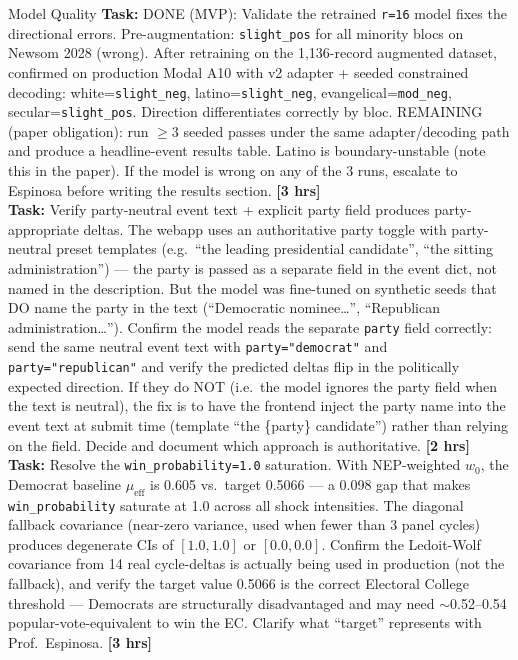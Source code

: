 \documentclass[11pt]{article}
\newcommand{\hrs}[1]{\textbf{[#1 hrs]}}
\newcommand{\task}[2]{%
  \noindent\textbf{Task:} #1 \hfill \hrs{#2}\\}
\begin{document}
\begin{taskbox}{Model Quality}
\task{DONE (MVP): Validate the retrained \texttt{r=16} model fixes the
  directional errors. Pre-augmentation: \texttt{slight\_pos} for all minority
  blocs on Newsom 2028 (wrong). After retraining on the 1,136-record augmented
  dataset, confirmed on production Modal A10 with v2 adapter + seeded constrained
  decoding: white=\texttt{slight\_neg}, latino=\texttt{slight\_neg},
  evangelical=\texttt{mod\_neg}, secular=\texttt{slight\_pos}. Direction
  differentiates correctly by bloc. REMAINING (paper obligation): run
  $\geq$3 seeded passes under the same adapter/decoding path and produce a
  headline-event results table. Latino is boundary-unstable (note this in
  the paper). If the model is wrong on any of the 3 runs, escalate to
  Espinosa before writing the results section.}{3}

\task{Verify party-neutral event text + explicit party field produces
  party-appropriate deltas. The webapp uses an authoritative party toggle
  with party-neutral preset templates (e.g.\ ``the leading presidential
  candidate'', ``the sitting administration'') --- the party is passed as a
  separate field in the event dict, not named in the description. But the
  model was fine-tuned on synthetic seeds that DO name the party in the
  text (``Democratic nominee\ldots{}'', ``Republican administration\ldots{}'').
  Confirm the model reads the separate \texttt{party} field correctly: send
  the same neutral event text with \texttt{party="democrat"} and
  \texttt{party="republican"} and verify the predicted deltas flip in the
  politically expected direction. If they do NOT (i.e.\ the model ignores
  the party field when the text is neutral), the fix is to have the
  frontend inject the party name into the event text at submit time
  (template ``the \{party\} candidate'') rather than relying on the field.
  Decide and document which approach is authoritative.}{2}

\task{Resolve the \texttt{win\_probability=1.0} saturation. With NEP-weighted
  $w_0$, the Democrat baseline $\mu_{\mathrm{eff}}$ is 0.605 vs.\ target
  0.5066 --- a 0.098 gap that makes \texttt{win\_probability} saturate at 1.0
  across all shock intensities. The diagonal fallback covariance (near-zero
  variance, used when fewer than 3 panel cycles) produces degenerate CIs of
  $[1.0,1.0]$ or $[0.0,0.0]$. Confirm the Ledoit-Wolf covariance from 14 real
  cycle-deltas is actually being used in production (not the fallback), and
  verify the target value 0.5066 is the correct Electoral College threshold ---
  Democrats are structurally disadvantaged and may need $\sim$0.52--0.54
  popular-vote-equivalent to win the EC. Clarify what ``target'' represents
  with Prof.\ Espinosa.}{3}


\end{taskbox}
\end{document}
